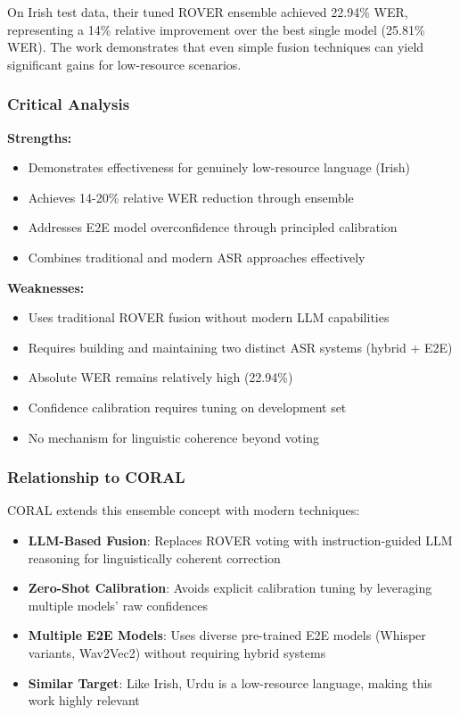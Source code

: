 On Irish test data, their tuned ROVER ensemble achieved 22.94\% WER, representing a 14\% relative improvement over the best single model (25.81\% WER). The work demonstrates that even simple fusion techniques can yield significant gains for low-resource scenarios.

\subsubsection{Critical Analysis}

\textbf{Strengths:}
\begin{itemize}
    \item Demonstrates effectiveness for genuinely low-resource language (Irish)
    \item Achieves 14-20\% relative WER reduction through ensemble
    \item Addresses E2E model overconfidence through principled calibration
    \item Combines traditional and modern ASR approaches effectively
\end{itemize}

\textbf{Weaknesses:}
\begin{itemize}
    \item Uses traditional ROVER fusion without modern LLM capabilities
    \item Requires building and maintaining two distinct ASR systems (hybrid + E2E)
    \item Absolute WER remains relatively high (22.94\%)
    \item Confidence calibration requires tuning on development set
    \item No mechanism for linguistic coherence beyond voting
\end{itemize}

\subsubsection{Relationship to CORAL}

CORAL extends this ensemble concept with modern techniques:

\begin{itemize}
    \item \textbf{LLM-Based Fusion}: Replaces ROVER voting with instruction-guided LLM reasoning for linguistically coherent correction
    \item \textbf{Zero-Shot Calibration}: Avoids explicit calibration tuning by leveraging multiple models' raw confidences
    \item \textbf{Multiple E2E Models}: Uses diverse pre-trained E2E models (Whisper variants, Wav2Vec2) without requiring hybrid systems
    \item \textbf{Similar Target}: Like Irish, Urdu is a low-resource language, making this work highly relevant
\end{itemize}

